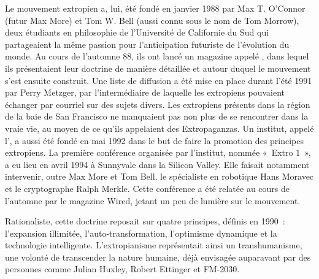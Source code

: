 Le mouvement extropien a, lui, été fondé en janvier 1988 par Max T. O'Connor (futur Max More) et Tom W. Bell (aussi connu sous le nom de Tom Morrow), deux étudiants en philosophie de l'Université de Californie du Sud qui partageaient la même passion pour l'anticipation futuriste de l'évolution du monde. Au cours de l'automne 88, ils ont lancé un magazine appelé , dans lequel ils présentaient leur doctrine de manière détaillée et autour duquel le mouvement s'est ensuite construit. Une liste de diffusion a été mise en place durant l'été 1991 par Perry Metzger, par l'intermédiaire de laquelle les extropiens pouvaient échanger par courriel sur des sujets divers. Les extropiens présents dans la région de la baie de San Francisco ne manquaient pas non plus de se rencontrer dans la vraie vie, au moyen de ce qu'ils appelaient des Extropaganzas. Un institut, appelé l', a aussi été fondé en mai 1992 dans le but de faire la promotion des principes extropiens. La première conférence organisée par l'institut, nommée «~Extro 1~», a eu lieu en avril 1994 à Sunnyvale dans la Silicon Valley. Elle faisait notamment intervenir, outre Max More et Tom Bell, le spécialiste en robotique Hans Moravec et le cryptographe Ralph Merkle. Cette conférence a été relatée au cours de l'automne par le magazine Wired, jetant un peu de lumière sur le mouvement.

Rationaliste, cette doctrine reposait sur quatre principes, définis en 1990~: l'expansion illimitée, l'auto-transformation, l'optimisme dynamique et la technologie intelligente. L'extropianisme représentait ainsi un transhumanisme, une volonté de transcender la nature humaine, déjà envisagée auparavant par des personnes comme Julian Huxley, Robert Ettinger et FM-2030. %

